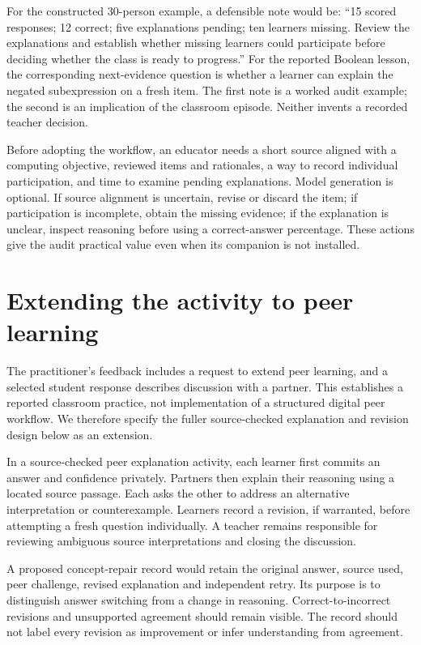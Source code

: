 For the constructed 30-person example, a defensible note would be: ``15 scored responses; 12 correct; five explanations pending; ten learners missing. Review the explanations and establish whether missing learners could participate before deciding whether the class is ready to progress.'' For the reported Boolean lesson, the corresponding next-evidence question is whether a learner can explain the negated subexpression on a fresh item. The first note is a worked audit example; the second is an implication of the classroom episode. Neither invents a recorded teacher decision.

Before adopting the workflow, an educator needs a short source aligned with a computing objective, reviewed items and rationales, a way to record individual participation, and time to examine pending explanations. Model generation is optional. If source alignment is uncertain, revise or discard the item; if participation is incomplete, obtain the missing evidence; if the explanation is unclear, inspect reasoning before using a correct-answer percentage. These actions give the audit practical value even when its companion is not installed.

\section{Extending the activity to peer learning}
The practitioner's feedback includes a request to extend peer learning, and a selected student response describes discussion with a partner. This establishes a reported classroom practice, not implementation of a structured digital peer workflow. We therefore specify the fuller source-checked explanation and revision design below as an extension.

In a source-checked peer explanation activity, each learner first commits an answer and confidence privately. Partners then explain their reasoning using a located source passage. Each asks the other to address an alternative interpretation or counterexample. Learners record a revision, if warranted, before attempting a fresh question individually. A teacher remains responsible for reviewing ambiguous source interpretations and closing the discussion.

A proposed concept-repair record would retain the original answer, source used, peer challenge, revised explanation and independent retry. Its purpose is to distinguish answer switching from a change in reasoning. Correct-to-incorrect revisions and unsupported agreement should remain visible. The record should not label every revision as improvement or infer understanding from agreement.

